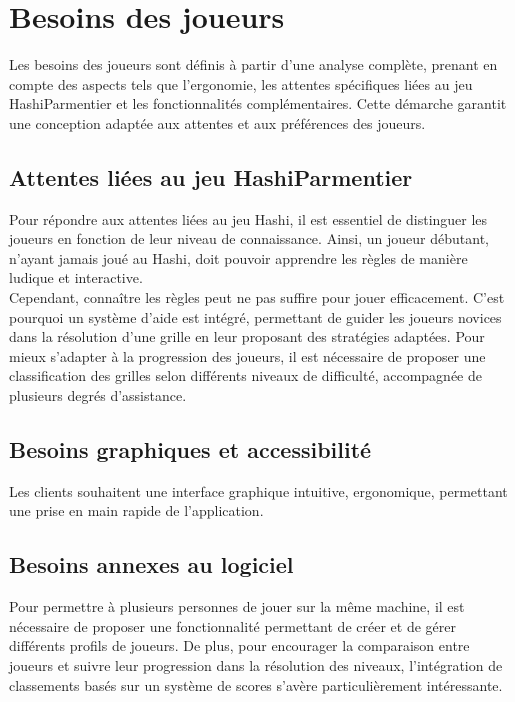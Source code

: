 \newpage\wPt\vspace{-2.5cm}
\section{Besoins des joueurs}
Les besoins des joueurs sont définis à partir d’une analyse complète, prenant en compte des aspects tels que l’ergonomie, les attentes spécifiques liées au jeu HashiParmentier et les fonctionnalités complémentaires. Cette démarche garantit une conception adaptée aux attentes et aux préférences des joueurs.

\subsection{Attentes liées au jeu HashiParmentier}
Pour répondre aux attentes liées au jeu Hashi, il est essentiel de distinguer les joueurs en fonction de leur niveau de connaissance.
Ainsi, un joueur débutant, n’ayant jamais joué au Hashi, doit pouvoir apprendre les règles de manière ludique et interactive.\\
Cependant, connaître les règles peut ne pas suffire pour jouer efficacement. C’est pourquoi un système d’aide est intégré, permettant de guider les joueurs novices dans la résolution d’une grille en leur proposant des stratégies adaptées.
Pour mieux s’adapter à la progression des joueurs, il est nécessaire de proposer une classification des grilles selon différents niveaux de difficulté, accompagnée de plusieurs degrés d’assistance.

\subsection{Besoins graphiques et accessibilité}
Les clients souhaitent une interface graphique intuitive, ergonomique, permettant une prise en main rapide de l'application. 

\subsection{Besoins annexes au logiciel}
Pour permettre à plusieurs personnes de jouer sur la même machine, il est nécessaire de proposer une fonctionnalité permettant de créer et de gérer différents profils de joueurs. De plus, pour encourager la comparaison entre joueurs et suivre leur progression dans la résolution des niveaux, l’intégration de classements basés sur un système de scores s’avère particulièrement intéressante.